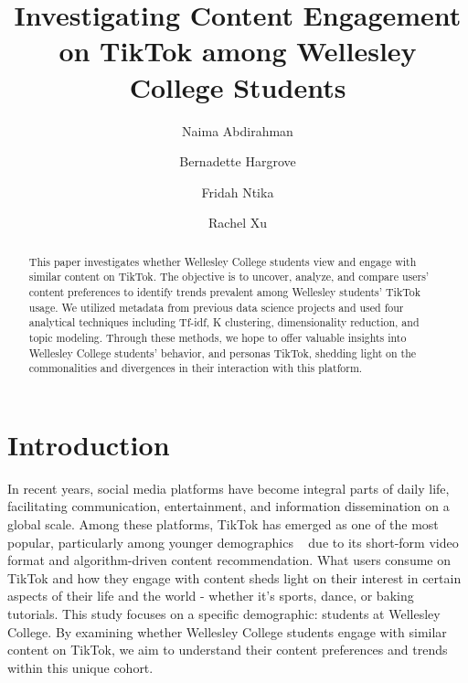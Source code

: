 \documentclass[acmtog]{acmart}
\begin{document}
\title{Investigating Content Engagement on TikTok among Wellesley College Students}

\author{Naima Abdirahman}
\author{Bernadette Hargrove}
\author{Fridah Ntika}
\author{Rachel Xu}

\renewcommand{\shortauthors}{Abdirahman et al.}

\begin{abstract}
  This paper investigates whether Wellesley College students view and engage with similar content on TikTok. The objective is to uncover, analyze, and compare users' content preferences to identify trends prevalent among Wellesley students' TikTok usage. We utilized metadata from previous data science projects and used four analytical techniques including Tf-idf, K clustering, dimensionality reduction, and topic modeling. Through these methods, we hope to offer valuable insights into Wellesley College students' behavior, and personas TikTok, shedding light on the commonalities and divergences in their interaction with this platform.
\end{abstract}

\maketitle

\section{Introduction}
In recent years, social media platforms have become integral parts of daily life, facilitating communication, entertainment, and information dissemination on a global scale. Among these platforms, TikTok has emerged as one of the most popular, particularly among younger demographics ~\cite{Howarth_2024} due to its short-form video format and algorithm-driven content recommendation.
What users consume on TikTok and how they engage with content sheds light on their interest in certain aspects of their life and the world - whether it's sports, dance, or baking tutorials. This study focuses on a specific demographic: students at Wellesley College. By examining whether Wellesley College students engage with similar content on TikTok, we aim to understand their content preferences and trends within this unique cohort.
\end{document}
